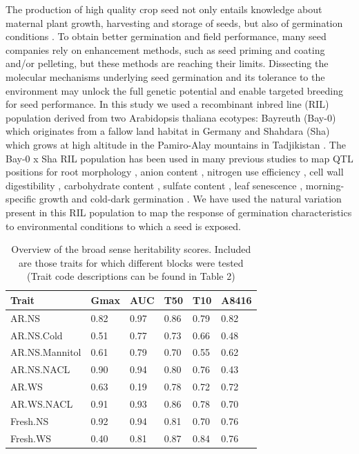 The production of high quality crop seed not only entails knowledge about maternal plant growth, 
harvesting and storage of seeds, but also of germination conditions \cite{Rivero-Lepinckas:2006}. 
To obtain better germination and field performance, many seed companies rely on enhancement methods, 
such as seed priming and coating and/or pelleting, but these methods are reaching their limits. 
Dissecting the molecular mechanisms underlying seed germination and its tolerance to the environment 
may unlock the full genetic potential and enable targeted breeding for seed performance. In this study 
we used a recombinant inbred line (RIL) population derived from two Arabidopsis thaliana ecotypes: 
Bayreuth (Bay-0) which originates from a fallow land habitat in Germany and Shahdara (Sha) which 
grows at high altitude in the Pamiro-Alay mountains in Tadjikistan \cite{Loudet:2002}. The Bay-0 x 
Sha RIL population has been used in many previous studies to map QTL positions for root morphology 
\cite{Loudet:2005, Reymond:2006}, anion content \cite{Loudet:2003a}, nitrogen use efficiency 
\cite{Loudet:2003b}, cell wall digestibility \cite{Barriere:2012}, carbohydrate content 
\cite{Calenge:2006}, sulfate content \cite{Loudet:2007}, leaf senescence \cite{Diaz:2006}, 
morning-specific growth \cite{Loudet:2008} and cold-dark germination \cite{Meng:2008}. We have used 
the natural variation present in this RIL population to map the response of germination characteristics 
to environmental conditions to which a seed is exposed.

\begin{table}[h]
  \centering
  {\footnotesize
  \begin{tabular}{  l  l  l  l  l  l }
    \hline
    {\bf Trait} & {\bf Gmax} & {\bf AUC} & {\bf T50}& {\bf T10}& {\bf A8416}\\
    \hline
    AR.NS           & 0.82 & 0.97 & 0.86 & 0.79 & 0.82 \\
    AR.NS.Cold      & 0.51 & 0.77 & 0.73 & 0.66 & 0.48 \\
    AR.NS.Mannitol  & 0.61 & 0.79 & 0.70 & 0.55 & 0.62 \\
    AR.NS.NACL      & 0.90 & 0.94 & 0.80 & 0.76 & 0.43 \\
    AR.WS           & 0.63 & 0.19 & 0.78 & 0.72 & 0.72 \\
    AR.WS.NACL      & 0.91 & 0.93 & 0.86 & 0.78 & 0.70 \\
    Fresh.NS        & 0.92 & 0.94 & 0.81 & 0.70 & 0.76 \\
    Fresh.WS        & 0.40 & 0.81 & 0.87 & 0.84 & 0.76 \\
    \hline
  \end{tabular}
  }
  \caption[Heritability Overview]{Overview of the broad sense heritability scores. Included are those traits for which different blocks 
          were tested (Trait code descriptions can be found in Table 2)}
\end{table}


